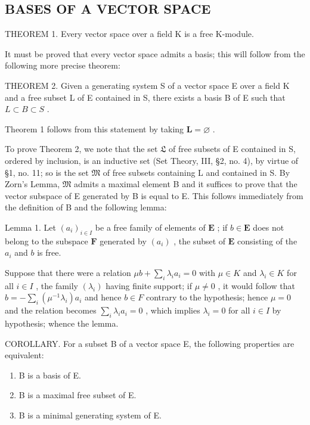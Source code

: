 \subsection{BASES OF A VECTOR SPACE}

THEOREM 1. Every vector space over a field K is a free K-module.

It must be proved that every vector space admits a basis; this will follow from the following more precise theorem:

THEOREM 2. Given a generating system S of a vector space E over a field K and a free subset L of E contained in S, there exists a basis B of E such that \(L \subset B \subset S\) .

Theorem 1 follows from this statement by taking \(\mathbf{L} = \varnothing\) .

To prove Theorem 2, we note that the set \(\mathfrak{L}\) of free subsets of E contained in S, ordered by inclusion, is an inductive set (Set Theory, III, §2, no. 4), by virtue of §1, no. 11; so is the set \(\mathfrak{M}\) of free subsets containing L and contained in S. By Zorn's Lemma, \(\mathfrak{M}\) admits a maximal element B and it suffices to prove that the vector subspace of E generated by B is equal to E. This follows immediately from the definition of B and the following lemma:

Lemma 1. Let \((a_{i})_{i\in I}\) be a free family of elements of \(\mathbf{E}\) ; if \(b\in \mathbf{E}\) does not belong to the subspace \(\mathbf{F}\) generated by \((a_{i})\) , the subset of \(\mathbf{E}\) consisting of the \(a_{i}\) and \(b\) is free.

Suppose that there were a relation \(\mu b + \sum_{i} \lambda_i a_i = 0\) with \(\mu \in K\) and \(\lambda_i \in K\) for all \(i \in I\) , the family \((\lambda_i)\) having finite support; if \(\mu \neq 0\) , it would follow that \(b = -\sum_{i} (\mu^{-1} \lambda_i) a_i\) and hence \(b \in F\) contrary to the hypothesis; hence \(\mu = 0\) and the relation becomes \(\sum_{i} \lambda_i a_i = 0\) , which implies \(\lambda_i = 0\) for all \(i \in I\) by hypothesis; whence the lemma.

COROLLARY. For a subset B of a vector space E, the following properties are equivalent:

\begin{enumerate}
\def\labelenumi{(\alph{enumi})}
\item
  B is a basis of E.
\item
  B is a maximal free subset of E.
\item
  B is a minimal generating system of E.
\end{enumerate}

